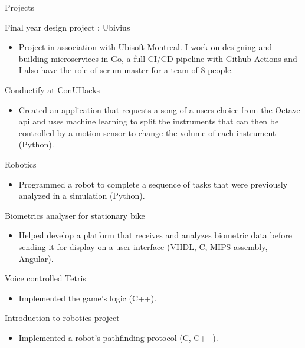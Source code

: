 \documentclass{article}
\newlength{\tabin}
\newlength{\secsep}
\newcommand{\lineunder}{\vspace*{-8pt} \\ \hspace*{-6pt} \hrulefill \\ \vspace*{-15pt}}
\newenvironment{tabbedsection}[1]{
  \begin{list}{}{
      \setlength{\itemsep}{0pt}
      \setlength{\labelsep}{0pt}
      \setlength{\labelwidth}{0pt}
      \setlength{\leftmargin}{\tabin}
      \setlength{\rightmargin}{\tabin}
      \setlength{\listparindent}{0pt}
      \setlength{\parsep}{0pt}
      \setlength{\parskip}{0pt}
      \setlength{\partopsep}{0pt}
      \setlength{\topsep}{#1}
    }
  \item[]
}{\end{list}}
\newenvironment{resume_section}[1]{
  \filbreak
  \vspace{2\secsep}
  \textsc{\large#1}
  \lineunder
  \begin{tabbedsection}{\secsep}
}{\end{tabbedsection}}
\newenvironment{resume_subsection}[2][]{
  \textbf{#2} \hfill {\footnotesize #1} \hspace{2em}
  \begin{tabbedsection}{0.5\secsep}
}{\end{tabbedsection}}
\newenvironment{subitems}{
  \renewcommand{\labelitemi}{-}
  \begin{itemize}
      \setlength{\labelsep}{1em}
}{\end{itemize}}
\begin{document}
\begin{resume_section}{Projects}
  \begin{resume_subsection}{Final year design project : Ubivius}
  \begin{subitems}
    \item Project in association with Ubisoft Montreal. I work on designing and building microservices in Go, a full CI/CD pipeline with Github Actions and I also have the role of scrum master for a team of 8 people.
    \end{subitems}
  \end{resume_subsection}
  \begin{resume_subsection}[January 2020]{Conductify at ConUHacks}
  \begin{subitems}
    \item Created an application that requests a song of a users choice from the Octave api and uses machine learning to split the instruments that can then be controlled by a motion sensor to change the volume of each instrument (Python).
    \end{subitems}
  \end{resume_subsection}
  
  \begin{resume_subsection}[Fall 2019]{Robotics}
  \begin{subitems}
    \item Programmed a robot to complete a sequence of tasks that were previously analyzed in a simulation (Python).
    \end{subitems}
  \end{resume_subsection}
  
  \begin{resume_subsection}[Winter 2019]{Biometrics analyser for stationary bike}
  \begin{subitems}
    \item Helped develop a platform that receives and analyzes biometric data before sending it for display on a user interface (VHDL, C, MIPS assembly, Angular).
    \end{subitems}
  \end{resume_subsection}
  
  \begin{resume_subsection}[Winter 2018]{Voice controlled Tetris}
    \begin{subitems}
        \item Implemented the game's logic (C++).
    \end{subitems}
  \end{resume_subsection}
  
  \begin{resume_subsection}[Fall 2017]{Introduction to robotics project}
    \begin{subitems}
    \item Implemented a robot's pathfinding protocol (C, C++).
    \end{subitems}
  \end{resume_subsection}
\end{resume_section}
\end{document}
